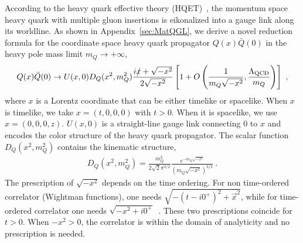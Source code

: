 \documentclass[a4paper,11pt]{article}
\begin{document}
According to the heavy quark effective theory (HQET)~\cite{IsgurWise1989,IsgurWise1990,EichtenHill1990,Georgi1990,Grinstein1990,Neubert1994,ManoharWise2000,FalkLuke1992,Bigi1993,Mannel:1991mc,Neubert:1996wg}, the momentum space heavy quark with multiple gluon insertions is eikonalized into a gauge link along its worldline. As shown in Appendix~\ref{sec:MatQGL}, we derive a novel reduction formula for the coordinate space heavy quark propagator $Q(x) \bar{Q}(0)$ in the heavy pole mass limit $m_{Q} \rightarrow +\infty$, 
\begin{align}\label{eq:MatQGLorg}
Q(x) \bar{Q}(0) \rightarrow U(x,0) D_{Q}(x^2,m_{Q}^2) \frac{i \slashed{x} + \sqrt{-x^2}}{2 \sqrt{-x^2}} \left[ 1 + O\left( \frac{1}{m_{Q} \sqrt{-x^2}}, \frac{\Lambda_{\rm QCD}}{m_{Q}} \right) \right] \ ,
\end{align}
where $x$ is a Lorentz coordinate that can be either timelike or spacelike. When $x$ is timelike, we take $x=(t,0,0,0)$ with $t>0$. When it is spacelike, we use $x=(0,0,0,z)$. $U(x,0)$ is a straight-line gauge link connecting $0$ to $x$ and encodes the color structure of the heavy quark propagator. The scalar function $D_{Q}(x^2,m_{Q}^2)$ contains the kinematic structure,
\begin{align}\label{eq:DQ}
D_{Q}(x^2,m_{Q}^2)  = \frac{m_{Q}^3}{2\sqrt{2} \pi^{3/2}} \frac{e^{-m_{Q} \sqrt{-x^2}}}{\left(m_{Q}\sqrt{-x^2}\right)^{3/2}} \ .
\end{align}
The prescription of $\sqrt{-x^2}$ depends on the time ordering. For non time-ordered correlator (Wightman functions), one needs $\sqrt{-(t-i 0^{+})^2+\vec{x}^2}$, while for time-ordered correlator one needs $\sqrt{-x^2+i0^{+}}$~\cite{Streater:1989vi,Jost:1965yxu,Kravchuk:2021kwe}. These two prescriptions coincide for $t>0$. When $-x^2>0$, the correlator is within the domain of analyticity and no prescription is needed.   
\end{document}
